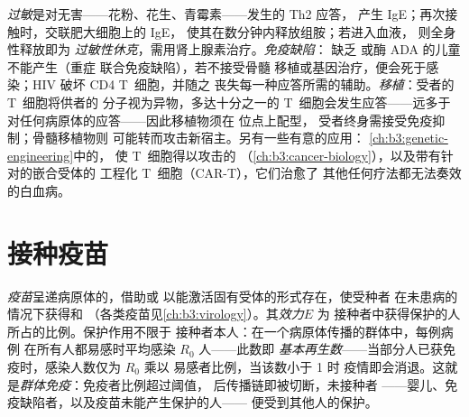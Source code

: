 \begin{example}\label{ex:b3:adaptive-immunity:failures}
\emph{过敏}是对无害——花粉、花生、青霉素——发生的 Th2 应答，
产生 IgE；再次接触时，交联肥大细胞上的 IgE，
使其在数分钟内释放组胺；若进入血液，
则全身性释放即为
\emph{过敏性休克}，需用肾上腺素治疗。\emph{免疫缺陷}：
缺乏  或酶 ADA 的儿童不能产生（重症
联合免疫缺陷），若不接受骨髓
移植或基因治疗，便会死于感染；HIV 破坏 CD4 T~细胞，并随之
丧失每一种应答所需的辅助。\emph{移植}：受者的 T~细胞将供者的
 分子视为异物，多达十分之一的 T~细胞会发生应答——远多于
对任何病原体的应答——因此移植物须在  位点上配型，
受者终身需接受免疫抑制；骨髓移植物则
可能转而攻击新宿主。另有一些有意的应用：
\cref{ch:b3:genetic-engineering}中的，
使 T~细胞得以攻击的
（\cref{ch:b3:cancer-biology}），以及带有针对的嵌合受体的
工程化 T~细胞（CAR-T），它们治愈了
其他任何疗法都无法奏效的白血病。
\end{example}

\section{接种疫苗}

\begin{definition}[疫苗与群体免疫]\label{def:b3:adaptive-immunity:vaccine}
\emph{疫苗}呈递病原体的，借助或
以能激活固有受体的形式存在，使受种者
在未患病的情况下获得和
（各类疫苗见\cref{ch:b3:virology}）。其\emph{效力}$E$ 为
接种者中获得保护的人所占的比例。保护作用不限于
接种者本人：在一个病原体传播的群体中，每例病例
在所有人都易感时平均感染 $R_{0}$ 人——此数即
\emph{基本再生数}——当部分人已获免疫时，感染人数仅为 $R_{0}$ 乘以
易感者比例，当该数小于 1 时
疫情即会消退。这就是\emph{群体免疫}：免疫者比例超过阈值，
后传播链即被切断，未接种者
——婴儿、免疫缺陷者，以及疫苗未能产生保护的人——
便受到其他人的保护。
\end{definition}

